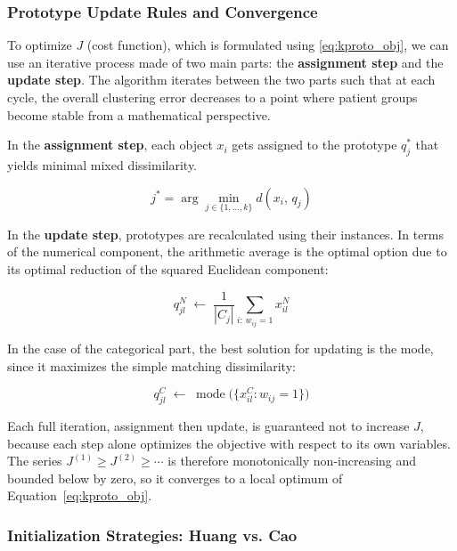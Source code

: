\subsubsection*{Prototype Update Rules and Convergence}

To optimize $J$ (cost function), which is formulated using \eqref{eq:kproto_obj}, we can use an iterative process made of two main parts: the \textbf{assignment step} and the \textbf{update step}. The algorithm iterates between the two parts such that at each cycle, the overall clustering error decreases to a point where patient groups become stable from a mathematical perspective.

\vspace{0.5em}

In the \textbf{assignment step}, each object $x_i$ gets assigned to the prototype $q_j^*$ that yields minimal mixed dissimilarity.

\begin{equation}
    j^* = \arg\min_{j \in \{1,\ldots,k\}} d(x_i,\, q_j)
\end{equation}

In the \textbf{update step}, prototypes are recalculated using their instances. In terms of the numerical component, the arithmetic average is the optimal option due to its optimal reduction of the squared Euclidean component:

\begin{equation}
    q_{jl}^{N} \;\leftarrow\; \frac{1}{|C_j|}\sum_{i:\, w_{ij}=1} x_{il}^{N}
\end{equation}

In the case of the categorical part, the best solution for updating is the mode, since it maximizes the simple matching dissimilarity:

\begin{equation}
    q_{jl}^{C} \;\leftarrow\; \operatorname{mode}\bigl(\{x_{il}^{C} : w_{ij} = 1\}\bigr)
\end{equation}

Each full iteration, assignment then update, is guaranteed not to increase $J$, because each step alone optimizes the objective with respect to its own variables. The series $J^{(1)} \geq J^{(2)} \geq \cdots$ is therefore monotonically non-increasing and bounded below by zero, so it converges to a local optimum of Equation~\eqref{eq:kproto_obj}.

\subsubsection*{Initialization Strategies: Huang vs. Cao}

